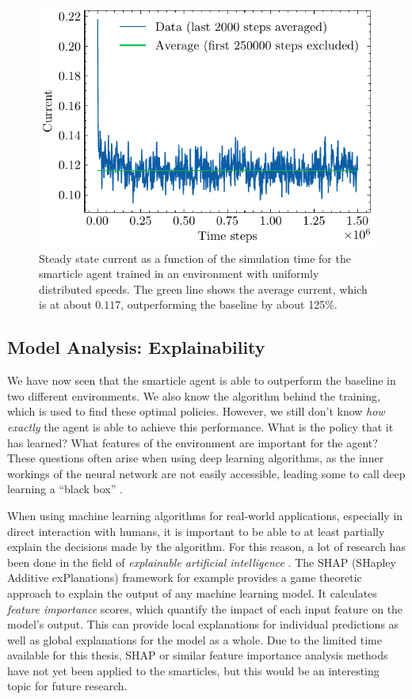 \begin{figure}[h]
    \centering
    \includegraphics{uniform_speeds.pdf}
    \caption{Steady state current as a function of the simulation time for the smarticle agent trained in an environment with uniformly distributed speeds. The green line shows the average current, which is at about $0.117$, outperforming the baseline by about 125\%.}
    \label{fig:uniform_speeds}
\end{figure}

\subsection{Model Analysis: Explainability}
\label{sec:model_analysis}
We have now seen that the smarticle agent is able to outperform the baseline in two different environments. We also know the algorithm behind the training, which is used to find these optimal policies. However, we still don't know \textit{how exactly} the agent is able to achieve this performance. What is the policy that it has learned? What features of the environment are important for the agent? These questions often arise when using deep learning algorithms, as the inner workings of the neural network are not easily accessible, leading some to call deep learning a \enquote{black box} \cite{blazek_blackbox_2022}.


When using machine learning algorithms for real-world applications, especially in direct interaction with humans, it is important to be able to at least partially explain the decisions made by the algorithm. For this reason, a lot of research has been done in the field of \textit{explainable artificial intelligence} \cite{explainable_ai_systematic_2023}. The SHAP (SHapley Additive exPlanations) framework \cite{lundberg_unified_2017, github_shapshap_2024} for example provides a game theoretic approach to explain the output of any machine learning model. It calculates \textit{feature importance} scores, which quantify the impact of each input feature on the model's output. This can provide local explanations for individual predictions as well as global explanations for the model as a whole. Due to the limited time available for this thesis, SHAP or similar feature importance analysis methods have not yet been applied to the smarticles, but this would be an interesting topic for future research.


